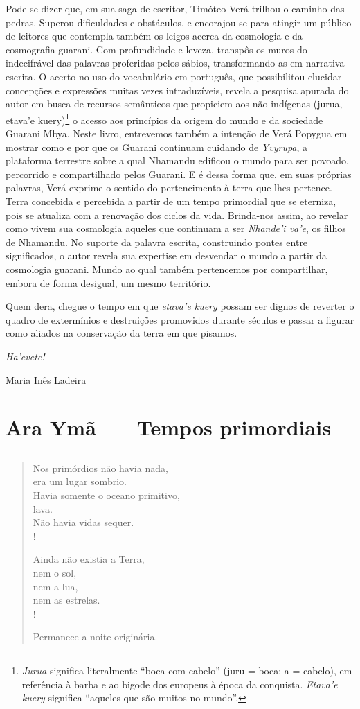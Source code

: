 Pode-se
dizer que, em sua saga de escritor, Timóteo Verá trilhou o caminho das pedras.
Superou dificuldades e obstáculos, e encorajou-se para atingir um público de
leitores que contempla também os leigos acerca da cosmologia e da cosmografia
guarani. Com profundidade e leveza, transpôs os muros do indecifrável das
palavras proferidas pelos sábios, transformando-as em narrativa escrita. O
acerto no uso do vocabulário em português, que possibilitou elucidar concepções
e expressões muitas vezes intraduzíveis, revela a pesquisa apurada do autor em
busca de recursos semânticos que propiciem aos não indígenas (jurua, etava’e
kuery)\footnote{\emph{Jurua} significa literalmente “boca com cabelo” (juru = boca; a
    = cabelo), em referência à barba e ao bigode dos europeus à época da
    conquista.  \emph{Etava’e kuery} significa “aqueles que são muitos no mundo”.} o
acesso aos princípios da origem do mundo e da sociedade Guarani Mbya.  Neste
livro, entrevemos também a intenção de Verá Popygua em mostrar como e por que
os Guarani continuam cuidando de \emph{Yvyrupa}, a plataforma terrestre sobre a qual
Nhamandu edificou o mundo para ser povoado, percorrido e compartilhado pelos
Guarani. E é dessa forma que, em suas próprias palavras, Verá exprime o sentido
do pertencimento à terra que lhes pertence. Terra concebida e percebida a
partir de um tempo primordial que se eterniza, pois se atualiza com a renovação
dos ciclos da vida. Brinda-nos assim, ao revelar como vivem sua cosmologia
aqueles que continuam a ser \emph{Nhande’i va’e}, os filhos de Nhamandu.  No suporte
da palavra escrita, construindo pontes entre significados, o autor revela sua
expertise em desvendar o mundo a partir da cosmologia guarani. Mundo ao qual
também pertencemos por compartilhar, embora de forma desigual, um mesmo
território.

Quem dera, chegue o tempo em que \emph{etava’e kuery} possam ser dignos
de reverter o quadro de extermínios e destruições promovidos durante séculos e
passar a figurar como aliados na conservação da terra em que pisamos.


\medskip\hfill\emph{Ha’evete!}

\bigskip
\hfill Maria Inês Ladeira



\part[Tempos primordiais]{Ara Ymã — Tempos primordiais}


\chapter*{}

 

\begin{verse}
Nos primórdios não havia nada,\\
era um lugar sombrio.\\
Havia somente o oceano primitivo,\\
lava.\\
Não havia vidas sequer.\\!
 

Ainda não existia a Terra,\\
nem o sol,\\
nem a lua,\\
nem as estrelas.\\!
 
Permanece a noite originária.
\end{verse}
